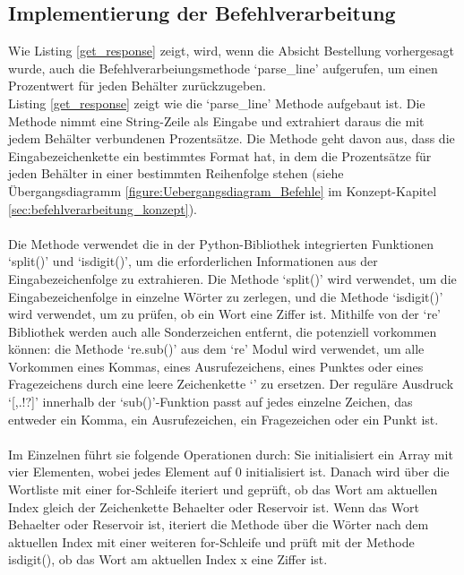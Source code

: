 \subsection{Implementierung der Befehlverarbeitung}
Wie Listing \ref{get_response} zeigt, wird, wenn die Absicht \glqq{}Bestellung\grqq{} vorhergesagt wurde, auch die Befehlverarbeiungsmethode `parse\_line' aufgerufen, um einen Prozentwert für jeden Behälter zurückzugeben.\\

Listing \ref{get_response} zeigt wie die `parse\_line' Methode aufgebaut ist. 
Die Methode nimmt eine String-Zeile als Eingabe und extrahiert daraus die mit jedem Behälter verbundenen Prozentsätze. 
Die Methode geht davon aus, dass die Eingabezeichenkette ein bestimmtes Format hat, in dem die Prozentsätze für jeden Behälter in einer bestimmten Reihenfolge stehen (siehe Übergangsdiagramm \ref{figure:Uebergangsdiagram_Befehle} im Konzept-Kapitel \ref{sec:befehlverarbeitung_konzept}).\\\\
Die Methode verwendet die in der Python-Bibliothek integrierten Funktionen `split()' und `isdigit()', um die erforderlichen Informationen aus der Eingabezeichenfolge zu extrahieren. 
Die Methode `split()' wird verwendet, um die Eingabezeichenfolge in einzelne Wörter zu zerlegen, und die Methode `isdigit()' wird verwendet, um zu prüfen, ob ein Wort eine Ziffer ist. 
Mithilfe von der `re' Bibliothek werden auch alle Sonderzeichen entfernt, die potenziell vorkommen können: die Methode `re.sub()' aus dem `re' Modul wird verwendet, um alle Vorkommen eines Kommas, eines Ausrufezeichens, eines Punktes oder eines Fragezeichens durch eine leere Zeichenkette `' zu ersetzen. 
Der reguläre Ausdruck `[,.!?]' innerhalb der `sub()'-Funktion passt auf jedes einzelne Zeichen, das entweder ein Komma, ein Ausrufezeichen, ein Fragezeichen oder ein Punkt ist.\\\\
Im Einzelnen führt sie folgende Operationen durch: 
Sie initialisiert ein Array mit vier Elementen, wobei jedes Element auf 0 initialisiert ist. 
Danach wird über die Wortliste mit einer for-Schleife iteriert und geprüft, ob das Wort am aktuellen Index gleich der Zeichenkette \glqq{}Behaelter\grqq{} oder \glqq{}Reservoir\grqq{} ist.
Wenn das Wort \glqq{}Behaelter\grqq{} oder \glqq{}Reservoir\grqq{} ist, iteriert die Methode über die Wörter nach dem aktuellen Index mit einer weiteren for-Schleife und prüft mit der Methode isdigit(), ob das Wort am aktuellen Index x eine Ziffer ist.
